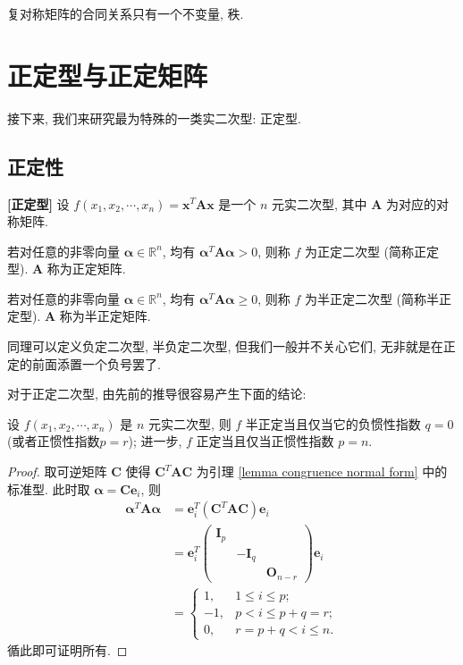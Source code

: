 \documentclass[UTF8]{book}
\begin{document}
复对称矩阵的合同关系只有一个不变量, 秩. 


\section{正定型与正定矩阵}
接下来, 我们来研究最为特殊的一类实二次型: 正定型. 
\subsection{正定性}
\begin{definition}
    \textbf{[正定型]}
    设 $f(x_1,x_2,\cdots,x_n) = \boldsymbol{x}^T\boldsymbol{A}\boldsymbol{x}$ 
    是一个 $n$ 元实二次型, 其中 $\boldsymbol{A}$ 为对应的对称矩阵. 

    若对任意的非零向量 $\boldsymbol{\alpha} \in \mathbb{R}^n$, 
    均有 $\boldsymbol{\alpha}^T\boldsymbol{A}\boldsymbol{\alpha}>0$, 
    则称 $f$ 为正定二次型 (简称正定型). $\boldsymbol{A}$ 称为正定矩阵. 

    若对任意的非零向量 $\boldsymbol{\alpha} \in \mathbb{R}^n$, 
    均有 $\boldsymbol{\alpha}^T\boldsymbol{A}\boldsymbol{\alpha}\geq0$, 
    则称 $f$ 为半正定二次型 (简称半正定型). $\boldsymbol{A}$ 称为半正定矩阵. 

    同理可以定义负定二次型, 半负定二次型, 但我们一般并不关心它们, 
    无非就是在正定的前面添置一个负号罢了. 
\end{definition}

对于正定二次型, 由先前的推导很容易产生下面的结论: 

\begin{theorem}
    设 $f(x_1,x_2,\cdots,x_n)$ 是 $n$ 元实二次型, 
    则 $f$ 半正定当且仅当它的负惯性指数 $q=0$ (或者正惯性指数$p=r$); 
    进一步, $f$ 正定当且仅当正惯性指数 $p=n$.
\end{theorem}

\begin{proof} 
    取可逆矩阵 $\boldsymbol{C}$ 使得 
    $ \boldsymbol{C}^T\boldsymbol{A}\boldsymbol{C} $ 为引理 
    \ref{lemma congruence normal form} 中的标准型. 
    此时取 $\boldsymbol{\alpha} = \boldsymbol{C}\boldsymbol{e}_i$, 
    则 
    $$
    \begin{aligned}
    \boldsymbol{\alpha}^T\boldsymbol{A}\boldsymbol{\alpha} 
    &= 
    \boldsymbol{e}_i^T(\boldsymbol{C}^T\boldsymbol{A}\boldsymbol{C})\boldsymbol{e}_i \\
    &=
    \boldsymbol{e}_i^T
    \begin{pmatrix}
        \boldsymbol{I}_p &  &  \\
         &-\boldsymbol{I}_q &  \\
         & & \boldsymbol{O}_{n-r} 
    \end{pmatrix}\boldsymbol{e}_i
    \\
    & =
    \begin{cases}
        1, &1\leq i \leq p;\\
        -1, & p<i \leq p+q = r;\\
        0, & r = p+q < i \leq n.
    \end{cases}
    \end{aligned} 
    $$
    循此即可证明所有. 
\end{proof}
\end{document}

